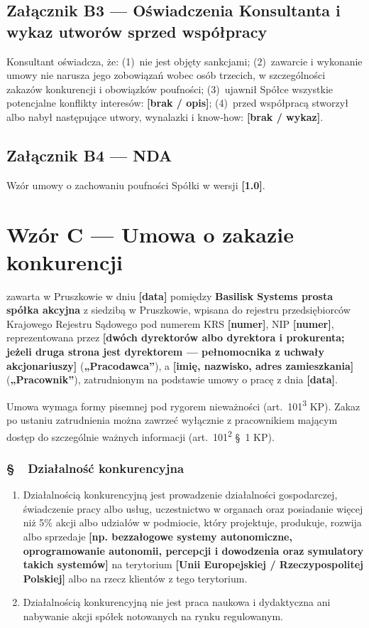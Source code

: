 \documentclass[11pt,a4paper]{report}
\newcounter{paragraf}
\newcommand{\paragraf}[1]{%
  \refstepcounter{paragraf}%
  \Needspace{5\baselineskip}%
  \subsection*{\S~\theparagraf\ #1}%
}
\newenvironment{ContractClause}[1]{\paragraf{#1}}{\par}
\newcommand{\field}[1]{\textbf{[#1]}}
\newcommand{\CompanyFull}{Basilisk Systems prosta spółka akcyjna}
\newcommand{\Strony}{\textbf{\CompanyFull{}} z siedzibą w Pruszkowie, wpisana do rejestru przedsiębiorców Krajowego Rejestru Sądowego pod numerem KRS \field{numer}, NIP \field{numer}, reprezentowana przez \field{dwóch dyrektorów albo dyrektora i prokurenta; jeżeli druga strona jest dyrektorem --- pełnomocnika z uchwały akcjonariuszy}}
\begin{document}
\section*{Załącznik B3 --- Oświadczenia Konsultanta i wykaz utworów sprzed współpracy}
Konsultant oświadcza, że: (1)~nie jest objęty sankcjami; (2)~zawarcie i wykonanie umowy nie narusza jego zobowiązań wobec osób trzecich, w szczególności zakazów konkurencji i obowiązków poufności; (3)~ujawnił Spółce wszystkie potencjalne konflikty interesów: \field{brak / opis}; (4)~przed współpracą stworzył albo nabył następujące utwory, wynalazki i know-how: \field{brak / wykaz}.

\section*{Załącznik B4 --- NDA}
Wzór umowy o zachowaniu poufności Spółki w wersji \field{1.0}.

\chapter*{Wzór C --- Umowa o zakazie konkurencji}
\setcounter{paragraf}{0}

zawarta w Pruszkowie w dniu \field{data} pomiędzy \Strony{} (\textbf{„Pracodawca”}), a \field{imię, nazwisko, adres zamieszkania} (\textbf{„Pracownik”}), zatrudnionym na podstawie umowy o pracę z dnia \field{data}.

{\small Umowa wymaga formy pisemnej pod rygorem nieważności (art.~101\textsuperscript{3} KP). Zakaz po ustaniu zatrudnienia można zawrzeć wyłącznie z pracownikiem mającym dostęp do szczególnie ważnych informacji (art.~101\textsuperscript{2} §~1 KP).\par}

\begin{ContractClause}{Działalność konkurencyjna}
\label{c:definicja}
\begin{enumerate}
  \item Działalnością konkurencyjną jest prowadzenie działalności gospodarczej, świadczenie pracy albo usług, uczestnictwo w organach oraz posiadanie więcej niż 5\% akcji albo udziałów w podmiocie, który projektuje, produkuje, rozwija albo sprzedaje \field{np. bezzałogowe systemy autonomiczne, oprogramowanie autonomii, percepcji i dowodzenia oraz symulatory takich systemów} na terytorium \field{Unii Europejskiej / Rzeczypospolitej Polskiej} albo na rzecz klientów z tego terytorium.
  \item Działalnością konkurencyjną nie jest praca naukowa i dydaktyczna ani nabywanie akcji spółek notowanych na rynku regulowanym.
\end{enumerate}
\end{ContractClause}
\end{document}
